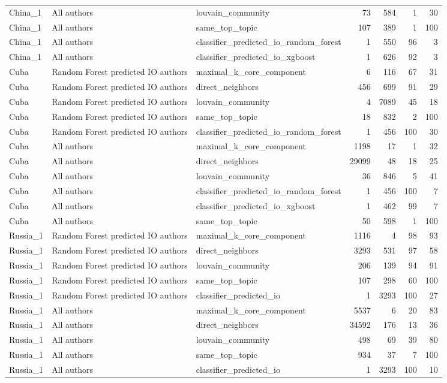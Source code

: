\begin{tabular}{lllrrrr}
China\_1 & All authors & louvain\_community & 73 & 584 & 1 & 30 \\
China\_1 & All authors & same\_top\_topic & 107 & 389 & 1 & 100 \\
China\_1 & All authors & classifier\_predicted\_io\_random\_forest & 1 & 550 & 96 & 3 \\
China\_1 & All authors & classifier\_predicted\_io\_xgboost & 1 & 626 & 92 & 3 \\
Cuba & Random Forest predicted IO authors & maximal\_k\_core\_component & 6 & 116 & 67 & 31 \\
Cuba & Random Forest predicted IO authors & direct\_neighbors & 456 & 699 & 91 & 29 \\
Cuba & Random Forest predicted IO authors & louvain\_community & 4 & 7089 & 45 & 18 \\
Cuba & Random Forest predicted IO authors & same\_top\_topic & 18 & 832 & 2 & 100 \\
Cuba & Random Forest predicted IO authors & classifier\_predicted\_io\_random\_forest & 1 & 456 & 100 & 30 \\
Cuba & All authors & maximal\_k\_core\_component & 1198 & 17 & 1 & 32 \\
Cuba & All authors & direct\_neighbors & 29099 & 48 & 18 & 25 \\
Cuba & All authors & louvain\_community & 36 & 846 & 5 & 41 \\
Cuba & All authors & classifier\_predicted\_io\_random\_forest & 1 & 456 & 100 & 7 \\
Cuba & All authors & classifier\_predicted\_io\_xgboost & 1 & 462 & 99 & 7 \\
Cuba & All authors & same\_top\_topic & 50 & 598 & 1 & 100 \\
Russia\_1 & Random Forest predicted IO authors & maximal\_k\_core\_component & 1116 & 4 & 98 & 93 \\
Russia\_1 & Random Forest predicted IO authors & direct\_neighbors & 3293 & 531 & 97 & 58 \\
Russia\_1 & Random Forest predicted IO authors & louvain\_community & 206 & 139 & 94 & 91 \\
Russia\_1 & Random Forest predicted IO authors & same\_top\_topic & 107 & 298 & 60 & 100 \\
Russia\_1 & Random Forest predicted IO authors & classifier\_predicted\_io & 1 & 3293 & 100 & 27 \\
Russia\_1 & All authors & maximal\_k\_core\_component & 5537 & 6 & 20 & 83 \\
Russia\_1 & All authors & direct\_neighbors & 34592 & 176 & 13 & 36 \\
Russia\_1 & All authors & louvain\_community & 498 & 69 & 39 & 80 \\
Russia\_1 & All authors & same\_top\_topic & 934 & 37 & 7 & 100 \\
Russia\_1 & All authors & classifier\_predicted\_io & 1 & 3293 & 100 & 10 \\
\bottomrule
\end{tabular}
